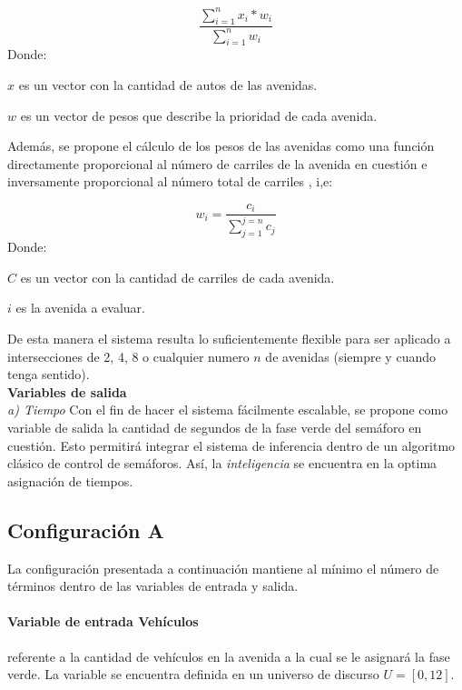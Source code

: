 \begin{displaymath}
\frac{\sum_{i=1}^{n} x_i * w_i}{\sum_{i=1}^{n} w_i}
\end{displaymath}
Donde:

{\setlength{\baselineskip}{0.7\baselineskip}\begin{description}
	\item $x$ es un vector con la cantidad de autos de las avenidas.
	\item $w$ es un vector de pesos que describe la prioridad de cada avenida.
\end{description}}

Además, se propone el cálculo de los pesos de las avenidas como una función directamente proporcional al número de carriles de la avenida en cuestión e inversamente proporcional al número total de carriles , i,e:

\begin{displaymath}
w_i = \frac{ c_i }{\sum_{j=1}^{j=n} c_j}
\end{displaymath}
Donde:
{\setlength{\baselineskip}{0.7\baselineskip}\begin{description}
		\item $C$ es un vector con la cantidad de carriles de cada avenida.
		\item $i$ es la avenida a evaluar.
\end{description}}
De esta manera el sistema resulta lo suficientemente flexible para ser aplicado a intersecciones de 2, 4, 8 o cualquier numero $n$ de avenidas (siempre y cuando tenga sentido).\\

\textbf{Variables de salida}\\
\textit{a) Tiempo} Con el fin de hacer el sistema fácilmente escalable, se propone como variable de salida la cantidad de segundos de la fase verde del semáforo en cuestión. Esto permitirá integrar el sistema de inferencia dentro de un algoritmo clásico de control de semáforos. Así, la \textit{inteligencia} se encuentra en la optima asignación de tiempos.

\newpage
\subsection{Configuración A}
La configuración presentada a continuación mantiene al mínimo el número de términos dentro de las variables de entrada y salida. 

\paragraph{Variable de entrada Vehículos} referente a la cantidad de vehículos en la avenida a la cual se le asignará la fase verde. La variable se encuentra definida en un universo de discurso $U = [0,12]$.

